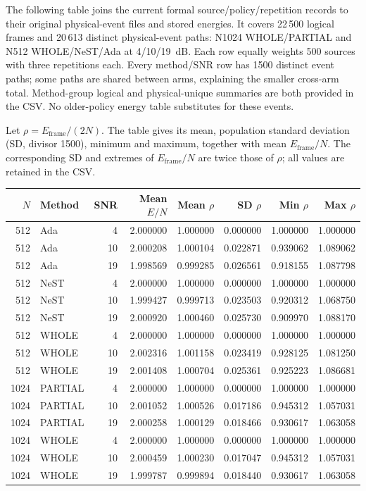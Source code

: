 \documentclass[11pt,letterpaper]{article}
\begin{document}
The following table joins the current formal source/policy/repetition records to their original physical-event files and stored energies. It covers 22\,500 logical frames and 20\,613 distinct physical-event paths: N1024 WHOLE/PARTIAL and N512 WHOLE/NeST/Ada at 4/10/19~dB. Each row equally weights 500 sources with three repetitions each. Every method/SNR row has 1500 distinct event paths; some paths are shared between arms, explaining the smaller cross-arm total. Method-group logical and physical-unique summaries are both provided in the CSV. No older-policy energy table substitutes for these events.

Let $\rho=E_{\mathrm{frame}}/(2N)$. The table gives its mean, population standard deviation (SD, divisor 1500), minimum and maximum, together with mean $E_{\mathrm{frame}}/N$. The corresponding SD and extremes of $E_{\mathrm{frame}}/N$ are twice those of $\rho$; all values are retained in the CSV.
\begin{center}\small\setlength{\tabcolsep}{4pt}
\begin{tabular}{rlrrrrrr}\toprule
$N$ & Method & SNR & Mean $E/N$ & Mean $\rho$ & SD $\rho$ & Min $\rho$ & Max $\rho$\\\midrule

512 & Ada & 4 & 2.000000 & 1.000000 & 0.000000 & 1.000000 & 1.000000\\
512 & Ada & 10 & 2.000208 & 1.000104 & 0.022871 & 0.939062 & 1.089062\\
512 & Ada & 19 & 1.998569 & 0.999285 & 0.026561 & 0.918155 & 1.087798\\
512 & NeST & 4 & 2.000000 & 1.000000 & 0.000000 & 1.000000 & 1.000000\\
512 & NeST & 10 & 1.999427 & 0.999713 & 0.023503 & 0.920312 & 1.068750\\
512 & NeST & 19 & 2.000920 & 1.000460 & 0.025730 & 0.909970 & 1.088170\\
512 & WHOLE & 4 & 2.000000 & 1.000000 & 0.000000 & 1.000000 & 1.000000\\
512 & WHOLE & 10 & 2.002316 & 1.001158 & 0.023419 & 0.928125 & 1.081250\\
512 & WHOLE & 19 & 2.001408 & 1.000704 & 0.025361 & 0.925223 & 1.086681\\
1024 & PARTIAL & 4 & 2.000000 & 1.000000 & 0.000000 & 1.000000 & 1.000000\\
1024 & PARTIAL & 10 & 2.001052 & 1.000526 & 0.017186 & 0.945312 & 1.057031\\
1024 & PARTIAL & 19 & 2.000258 & 1.000129 & 0.018466 & 0.930617 & 1.063058\\
1024 & WHOLE & 4 & 2.000000 & 1.000000 & 0.000000 & 1.000000 & 1.000000\\
1024 & WHOLE & 10 & 2.000459 & 1.000230 & 0.017047 & 0.945312 & 1.057031\\
1024 & WHOLE & 19 & 1.999787 & 0.999894 & 0.018440 & 0.930617 & 1.063058\\
\bottomrule\end{tabular}\end{center}
\end{document}
